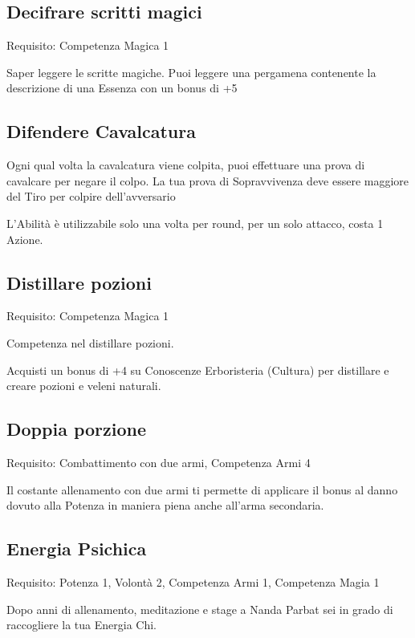 \documentclass[a4paper,11pt,twoside,openany]{book}
\begin{document}
\subsection{Decifrare scritti magici}

Requisito: Competenza Magica 1

Saper leggere le scritte magiche. Puoi leggere una pergamena contenente la descrizione di una Essenza con un bonus di +5

\subsection{Difendere Cavalcatura}

Ogni qual volta la cavalcatura viene colpita, puoi effettuare una prova di cavalcare per negare il colpo. La tua prova di Sopravvivenza deve essere maggiore del Tiro per colpire dell'avversario

L'Abilità è utilizzabile solo una volta per round, per un solo attacco, costa 1 Azione.

\subsection{Distillare pozioni}

Requisito: Competenza Magica 1

Competenza nel distillare pozioni.

Acquisti un bonus di +4 su Conoscenze Erboristeria (Cultura) per distillare e creare pozioni e veleni naturali.

\subsection{Doppia porzione}

Requisito: Combattimento con due armi, Competenza Armi 4

Il costante allenamento con due armi ti permette di applicare il bonus al danno dovuto alla Potenza in maniera piena anche all'arma secondaria.

\subsection{Energia Psichica}

Requisito: Potenza 1, Volontà 2, Competenza Armi 1, Competenza Magia 1

Dopo anni di allenamento, meditazione e stage a Nanda Parbat sei in grado di raccogliere la tua Energia Chi.
\end{document}
